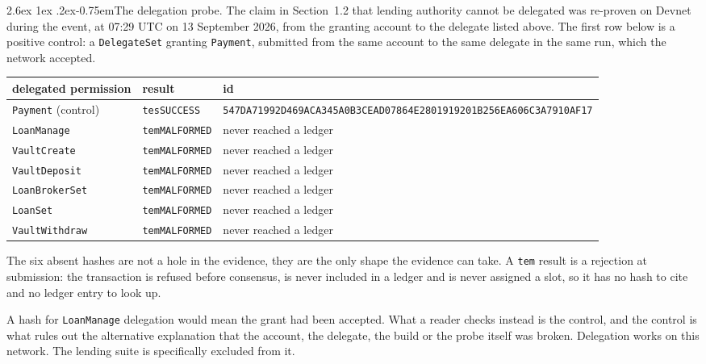 \documentclass[11pt]{article}
\makeatletter
\renewcommand{\arraystretch}{1.22}
\renewcommand\paragraph{\@startsection{paragraph}{4}{\z@}%
  {2.6ex \@plus 1ex \@minus .2ex}{-0.75em}{\normalfont\normalsize\bfseries}}
\theoremstyle{orma}
\theoremstyle{ormaupright}
\makeatother
\begin{document}
\pagebreak

\paragraph{The delegation probe.} The claim in Section~1.2 that lending authority cannot be
delegated was re-proven on Devnet during the event, at 07:29 UTC on 13 September 2026,
from the granting account to the delegate listed above. The first row below is a positive
control: a \texttt{DelegateSet} granting \texttt{Payment}, submitted from the same account to
the same delegate in the same run, which the network accepted.

\begin{center}
\scriptsize
\setlength{\tabcolsep}{5pt}
\renewcommand{\arraystretch}{1.35}
\begin{tabular}{lll}
\toprule
delegated permission & result & id \\
\midrule
\texttt{Payment} (control) & \texttt{tesSUCCESS} & \texttt{547DA71992D469ACA345A0B3CEAD07864E2801919201B256EA606C3A7910AF17} \\
\addlinespace
\texttt{LoanManage} & \texttt{temMALFORMED} & never reached a ledger \\
\texttt{VaultCreate} & \texttt{temMALFORMED} & never reached a ledger \\
\texttt{VaultDeposit} & \texttt{temMALFORMED} & never reached a ledger \\
\texttt{LoanBrokerSet} & \texttt{temMALFORMED} & never reached a ledger \\
\texttt{LoanSet} & \texttt{temMALFORMED} & never reached a ledger \\
\texttt{VaultWithdraw} & \texttt{temMALFORMED} & never reached a ledger \\
\bottomrule
\end{tabular}
\end{center}

The six absent hashes are not a hole in the evidence, they are the only shape the evidence
can take. A \texttt{tem} result is a rejection at submission: the transaction is refused
before consensus, is never included in a ledger and is never assigned a slot, so it has no
hash to cite and no ledger entry to look up.

A hash for \texttt{LoanManage} delegation would
mean the grant had been accepted. What a reader checks instead is the control, and the
control is what rules out the alternative explanation that the account, the delegate, the
build or the probe itself was broken. Delegation works on this network. The lending suite is
specifically excluded from it.
\end{document}
